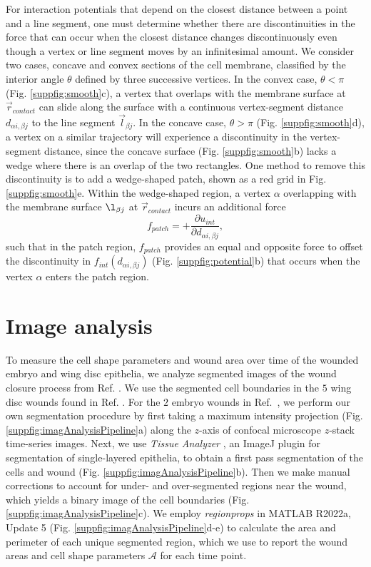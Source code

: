 \documentclass[%
 reprint,
superscriptaddress,
 amsmath,amssymb,
pre,
]{revtex4-2}
\begin{document}
For interaction potentials that depend on the closest distance between a point and a line segment, one must determine whether there are discontinuities in the force that can occur when the closest distance changes discontinuously even though a vertex or line segment moves by an infinitesimal amount. We consider two cases, concave and convex sections of the cell membrane, classified by the interior angle $\theta$ defined by three successive vertices. In the convex case, $\theta < \pi$ (Fig. \ref{suppfig:smooth}c), a vertex that overlaps with the membrane surface at $\vec{r}_{contact}$ can slide along the surface with a continuous vertex-segment distance $d_{\alpha i,\beta j}$ to the line segment ${\vec l}_{\beta j}$. In the concave case, $\theta > \pi$ (Fig. \ref{suppfig:smooth}d), a vertex on a similar trajectory will experience a discontinuity in the vertex-segment distance, since the concave surface (Fig. \ref{suppfig:smooth}b) lacks a wedge where there is an overlap of the two rectangles. One method to remove this discontinuity is to add a wedge-shaped patch, shown as a red grid in Fig. \ref{suppfig:smooth}e. Within the wedge-shaped region, a vertex $\alpha$ overlapping with the membrane surface $\l_{\beta j}$ at $\vec{r}_{contact}$ incurs an additional force 
\begin{equation}
    f_{patch} = +\frac{\partial u_{int}}{\partial d_{\alpha i, \beta j}},
    \label{suppeq:vertexPatchForce}
\end{equation}
such that in the patch region, $f_{patch}$ provides an equal and opposite force to offset the discontinuity in $f_{int}(d_{\alpha i, \beta j})$ (Fig. \ref{suppfig:potential}b) that occurs when the vertex $\alpha$ enters the patch region. 

\section{Image analysis}
To measure the cell shape parameters and wound area over time of the wounded embryo and wing disc epithelia, we analyze segmented images of the wound closure process from Ref. \cite{tetley2019tissue}. We use the segmented cell boundaries in the $5$ wing disc wounds found in Ref. \cite{tetley2019tissue}. For the $2$ embryo wounds in Ref.~\cite{tetley2019tissue}, we perform our own segmentation procedure by first taking a maximum intensity projection (Fig. \ref{suppfig:imagAnalysisPipeline}a) along the $z$-axis of confocal microscope $z$-stack time-series images. Next, we use \textit{Tissue Analyzer} \cite{Aigouy2016}, an ImageJ plugin for segmentation of single-layered epithelia, to obtain a first pass segmentation of the cells and wound (Fig. \ref{suppfig:imagAnalysisPipeline}b). Then we make manual corrections to account for under- and over-segmented regions near the wound, which yields a binary image of the cell boundaries (Fig. \ref{suppfig:imagAnalysisPipeline}c). We employ \textit{regionprops} in MATLAB R2022a, Update 5 (Fig. \ref{suppfig:imagAnalysisPipeline}d-e) to calculate the area and perimeter of each unique segmented region, which we use to report the wound areas and cell shape parameters $\mathcal{A}$ for each time point. 
\end{document}
